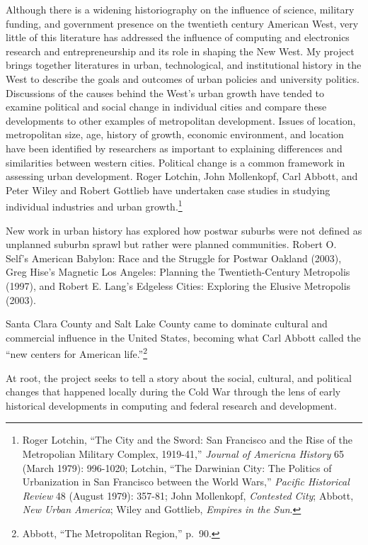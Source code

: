 \documentclass[11pt,article,oneside]{memoir}
\begin{document}
Although there is a widening historiography on the influence of science,
military funding, and government presence on the twentieth century
American West, very little of this literature has addressed the
influence of computing and electronics research and entrepreneurship and
its role in shaping the New West. My project brings together literatures
in urban, technological, and institutional history in the West to
describe the goals and outcomes of urban policies and university
politics. Discussions of the causes behind the West's urban growth have
tended to examine political and social change in individual cities and
compare these developments to other examples of metropolitan
development. Issues of location, metropolitan size, age, history of
growth, economic environment, and location have been identified by
researchers as important to explaining differences and similarities
between western cities. Political change is a common framework in
assessing urban development. Roger Lotchin, John Mollenkopf, Carl
Abbott, and Peter Wiley and Robert Gottlieb have undertaken case studies
in studying individual industries and urban growth.\footnote{Roger
  Lotchin, ``The City and the Sword: San Francisco and the Rise of the
  Metropolian Military Complex, 1919-41,'' \emph{Journal of Americna
  History} 65 (March 1979): 996-1020; Lotchin, ``The Darwinian City: The
  Politics of Urbanization in San Francisco between the World Wars,''
  \emph{Pacific Historical Review} 48 (August 1979): 357-81; John
  Mollenkopf, \emph{Contested City}; Abbott, \emph{New Urban America};
  Wiley and Gottlieb, \emph{Empires in the Sun}.}

New work in urban history has explored how postwar suburbs were not
defined as unplanned suburbn sprawl but rather were planned communities.
Robert O. Self's American Babylon: Race and the Struggle for Postwar
Oakland (2003), Greg Hise's Magnetic Los Angeles: Planning the
Twentieth-Century Metropolis (1997), and Robert E. Lang's Edgeless
Cities: Exploring the Elusive Metropolis (2003).

Santa Clara County and Salt Lake County came to dominate cultural and
commercial influence in the United States, becoming what Carl Abbott
called the ``new centers for American life.''\footnote{Abbott, ``The
  Metropolitan Region,'' p.~90.}

At root, the project seeks to tell a story about the social, cultural,
and political changes that happened locally during the Cold War through
the lens of early historical developments in computing and federal
research and development.
\end{document}
